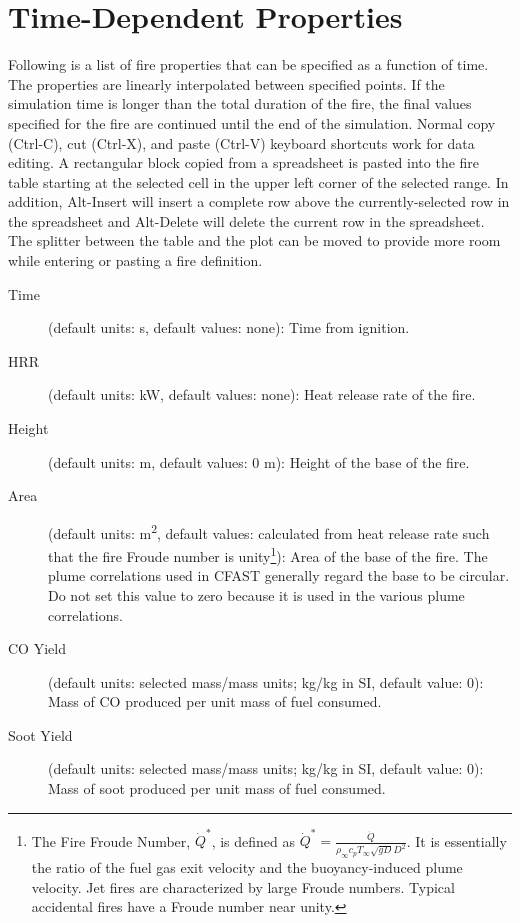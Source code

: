 {{\section{Time-Dependent Properties}
\label{info:FIRE2}
Following is a list of fire properties that can be specified as a function of time. The properties are linearly interpolated between specified points. If the simulation time is longer than the total duration of the fire, the final values specified for the fire are continued until the end of the simulation. Normal copy (Ctrl-C), cut (Ctrl-X), and paste (Ctrl-V) keyboard shortcuts work for data editing. A rectangular block copied from a spreadsheet is pasted into the fire table starting at the selected cell in the upper left corner of the selected range. In addition, Alt-Insert will insert a complete row above the currently-selected row in the spreadsheet and Alt-Delete will delete the current row in the spreadsheet. The splitter between the table and the plot can be moved to provide more room while entering or pasting a fire definition.
\begin{description}
\item[Time] (default units: s, default values: none): Time from ignition.
\item[HRR] (default units: kW, default values: none): Heat release rate of the fire.
\item[Height] (default units: m, default values: 0 m): Height of the base of the fire.
\item[Area] (default units: \unit{m^2}, default values: calculated from heat release rate such that the fire Froude number is unity\footnote{The Fire Froude Number, $\dot{Q}^*$, is defined as $\dot{Q}^* = \frac{\dot{Q}}{\rho_\infty c_p T_\infty \sqrt{gD} D^2}$. It is essentially the ratio of the fuel gas exit velocity and the buoyancy-induced plume velocity. Jet fires are characterized by large Froude numbers. Typical accidental fires have a Froude number near unity.}): Area of the base of the fire. The plume correlations used in CFAST generally regard the base to be circular. Do not set this value to zero because it is used in the various plume correlations.
\item[CO Yield] (default units: selected mass/mass units; kg/kg in SI, default value: 0): Mass of CO produced per unit mass of fuel consumed.
\item[Soot Yield] (default units: selected mass/mass units; kg/kg in SI, default value: 0): Mass of soot produced per unit mass of fuel consumed.

\end{description}}}
